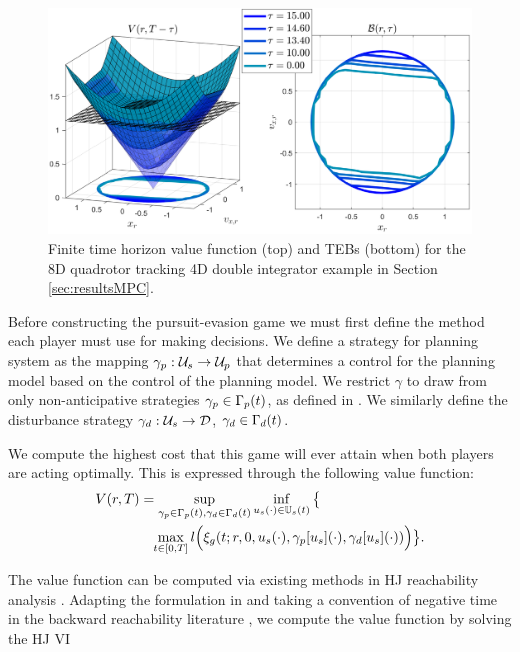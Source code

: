 \begin{figure}
	\centering
  \includegraphics[width=\columnwidth]{fig/tv_valfunc}
  \caption{Finite time horizon value function (top) and TEBs (bottom) for the 8D quadrotor tracking 4D double integrator example in Section \ref{sec:resultsMPC}.}  
  \label{fig:vf_TEB:8D4D}
\end{figure} 




Before constructing the pursuit-evasion game we must first define the method each player must use for making decisions. 
We define a strategy for planning system as the mapping $\gamma_{p} : \mathcal{U}_s \rightarrow \mathcal{U}_p$ that determines a control for the planning model based on the control of the planning model. We restrict $\gamma$ to draw from only non-anticipative strategies $\gamma_{p} \in \Gamma_p(t)$, as defined in \cite{Mitchell05}. 
We similarly define the disturbance strategy $\gamma_{d}: \mathcal{U}_s \rightarrow \mathcal{D}$, $\gamma_{d} \in \Gamma_d(t)$.

We compute the highest cost that this game will ever attain when both players are acting optimally. 
This is expressed through the following value function:
\begin{align}
&V(\rstate,\thor)= \sup_{\gamma_{\pstate} \in \Gamma_\pstate(t), \gamma_{\dstb} \in \Gamma_\dstb(t)} \inf_{\tctrl(\cdot) \in \tcfset(t)} \big\{ \nonumber \\
&\qquad\qquad \max_{\tvar\in [0, \thor]} \errfunc\Big(\rtraj(\tvar; \rstate, 0, \tctrl(\cdot), \gamma_\pstate[\tctrl](\cdot), \gamma_\dstb[\tctrl](\cdot))\Big)\big\}. \label{eq:valfunc}
\end{align} 

The value function can be computed via existing methods in HJ reachability analysis \cite{Mitchell05, Fisac15}.
Adapting the formulation in \cite{Fisac15} and taking a convention of negative time in the backward reachability literature \cite{Chen2016DecouplingJournal, Chen2018}, we compute the value function by solving the HJ VI

